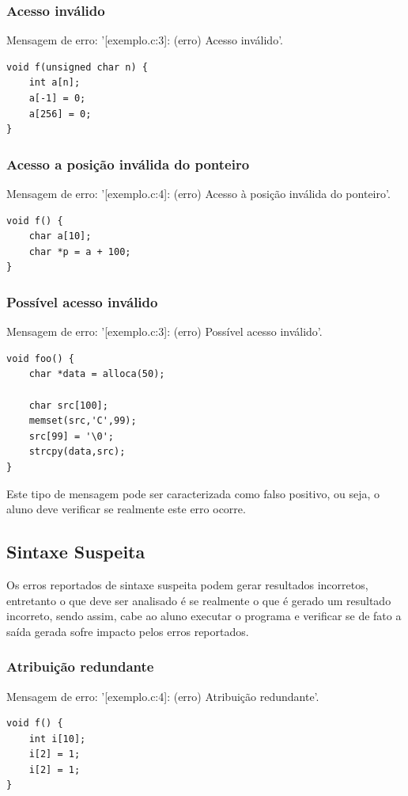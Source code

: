 \documentclass[12pt,a4paper]{report}
\begin{document}
\subsubsection{Acesso inválido}
Mensagem de erro: '[exemplo.c:3]: (erro) Acesso inválido'.
\begin{lstlisting}[style=CStyle]
void f(unsigned char n) {
    int a[n];
    a[-1] = 0;
    a[256] = 0;
}
\end{lstlisting}

\subsubsection{Acesso a posição inválida do ponteiro}
Mensagem de erro: '[exemplo.c:4]: (erro) Acesso à posição inválida do ponteiro'.
\begin{lstlisting}[style=CStyle]
void f() {
    char a[10];
    char *p = a + 100;
}
\end{lstlisting}

\subsubsection{Possível acesso inválido}
Mensagem de erro: '[exemplo.c:3]: (erro) Possível acesso inválido'.
\begin{lstlisting}[style=CStyle]
void foo() {
    char *data = alloca(50);

    char src[100];
    memset(src,'C',99);
    src[99] = '\0';
    strcpy(data,src);
}
\end{lstlisting}
Este tipo de mensagem pode ser caracterizada como falso positivo, ou seja, o aluno deve verificar se realmente este erro ocorre.

\subsection{Sintaxe Suspeita}
Os erros reportados de sintaxe suspeita podem gerar resultados incorretos, entretanto o que deve ser analisado é se realmente o que é gerado um resultado incorreto, sendo assim, cabe ao aluno executar o programa e verificar se de fato a saída gerada sofre impacto pelos erros reportados.


\subsubsection{Atribuição redundante}
Mensagem de erro: '[exemplo.c:4]: (erro) Atribuição redundante'.
\begin{lstlisting}[style=CStyle]
void f() {
    int i[10];
    i[2] = 1;
    i[2] = 1;
}
\end{lstlisting}
\end{document}
